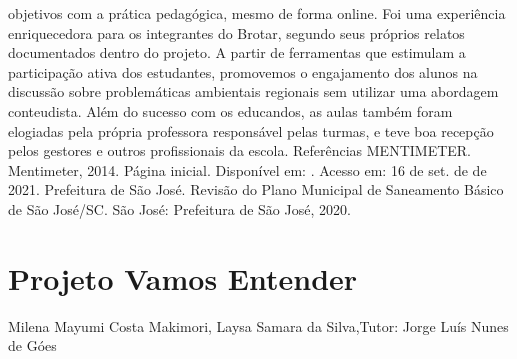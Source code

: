 objetivos com a prática pedagógica, mesmo de forma online. Foi uma experiência
enriquecedora para os integrantes do Brotar, segundo seus próprios relatos documentados
dentro do projeto. A partir de ferramentas que estimulam a participação ativa dos estudantes,
promovemos o engajamento dos alunos na discussão sobre problemáticas ambientais
regionais sem utilizar uma abordagem conteudista. Além do sucesso com os educandos, as
aulas também foram elogiadas pela própria professora responsável pelas turmas, e teve boa
recepção pelos gestores e outros profissionais da escola.
Referências
MENTIMETER. Mentimeter, 2014. Página inicial. Disponível em:
. Acesso em: 16 de set. de de 2021.
Prefeitura de São José. Revisão do Plano Municipal de Saneamento Básico de São
José/SC. São José: Prefeitura de São José, 2020.




\section*{Projeto Vamos Entender}

Milena Mayumi Costa Makimori, Laysa Samara da Silva,Tutor: Jorge Luís Nunes de Góes


